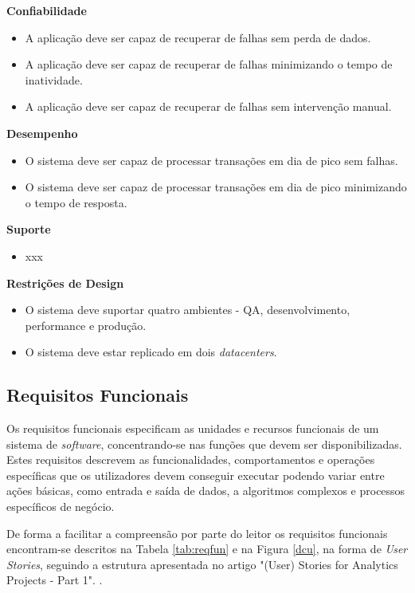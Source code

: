 \textbf{Confiabilidade}
\begin{itemize}
  \item A aplicação deve ser capaz de recuperar de falhas sem perda de dados.
  \item A aplicação deve ser capaz de recuperar de falhas minimizando o tempo de inatividade.
  \item A aplicação deve ser capaz de recuperar de falhas sem intervenção manual.
\end{itemize}

\textbf{Desempenho}
\begin{itemize}
  \item O sistema deve ser capaz de processar transações em dia de pico sem falhas.
  \item O sistema deve ser capaz de processar transações em dia de pico minimizando o tempo de resposta.
\end{itemize}

\textbf{Suporte}
\begin{itemize}
  \item xxx
\end{itemize}

\textbf{Restrições de Design}
\begin{itemize}
  \item O sistema deve suportar quatro ambientes - \ac{QA}, desenvolvimento, 
    performance e produção.
  \item O sistema deve estar replicado em dois \textit{datacenters}.
\end{itemize}

\subsection{Requisitos Funcionais}
\label{sec:3-rf}

Os requisitos funcionais especificam as unidades e recursos funcionais de um sistema de 
\textit{software}, concentrando-se nas funções que devem ser disponibilizadas. Estes requisitos 
descrevem as funcionalidades, comportamentos e operações específicas que os utilizadores devem 
conseguir executar podendo variar entre ações básicas, como entrada e saída de dados, a algoritmos 
complexos e processos específicos de negócio.

De forma a facilitar a compreensão por parte do leitor os requisitos funcionais encontram-se 
descritos na Tabela \ref{tab:reqfun} e na Figura \ref{dcu}, na forma de \textit{User Stories}, 
seguindo a estrutura apresentada no artigo "(User) Stories for Analytics Projects - Part 1". \cite{us}.

